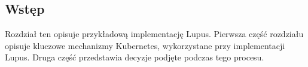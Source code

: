 \subsection{Wstęp}
Rozdział ten opisuje przykładową implementację Lupus. Pierwsza część rozdziału opisuje kluczowe mechanizmy Kubernetes, wykorzystane przy implementacji Lupus. Druga część przedstawia decyzje podjęte podczas tego procesu.